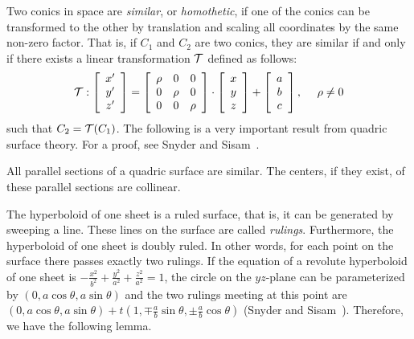      Two conics in space are {\em similar}, or {\em homothetic}, if one
of the conics can be transformed to the other by translation and scaling all
coordinates by the same non-zero factor.  That is, if $C_1$ and $C_2$ are
two conics, they are similar if and only if there exists a linear
transformation ${\cal T}$ defined as follows:
\[ {\cal T} : \left[ \begin{array}{c}
                    x^\prime \\ y^\prime \\ z^\prime
              \end{array} \right] =
       \left[ \begin{array}{ccc}
                    \rho &   0   &   0    \\
                      0  & \rho  &   0    \\
                      0  &   0   & \rho
              \end{array} \right] \cdot
       \left[ \begin{array}{c}
                    x \\ y \\ z
              \end{array} \right] +
       \left[ \begin{array}{c}
                    a \\ b \\ c
              \end{array} \right],\ \ \ \ \rho\neq 0  \]
such that $C_2={\cal T}(C_1)$.  The following is a very important result
from quadric surface theory.
For a proof, see Snyder and Sisam~\cite{snyder-sisam:1914}.

\begin{lemma}
\label{lemma:similar}
     All parallel sections of a quadric surface are similar.  The centers, if
they exist, of these parallel sections are collinear.
\end{lemma}

     The hyperboloid of one sheet is a ruled surface, that is, it can be
generated by sweeping a line.  These lines on the surface are called
{\em rulings}.  Furthermore, the hyperboloid of one sheet is doubly ruled.
In other words, for each point on the surface there passes exactly two rulings.
If the equation of a revolute hyperboloid of one sheet
is $-\frac{x^2}{b^2}+\frac{y^2}{a^2}+\frac{z^2}{a^2}=1$, the circle on the
$yz$-plane can be parameterized by $(0,a\cos\theta,a\sin\theta)$ and the two
rulings meeting at this point are $(0,a\cos\theta,a\sin\theta)+
t\left(1,\mp\frac{a}{b}\sin\theta,\pm\frac{a}{b}\cos\theta\right)$
(Snyder and Sisam~\cite{snyder-sisam:1914}).  Therefore, we have the following
lemma.

